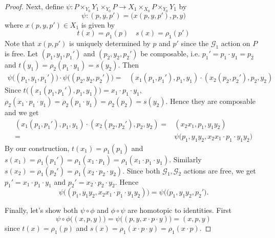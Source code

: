 \documentclass[12pt]{amsart}
\theoremstyle{definition}
\theoremstyle{remark}
\numberwithin{equation}{section}
\newcommand{\CG}{{\mathcal G}}
\begin{document}
\begin{proof}
	Next, define $\psi: P \times_{Y_0} Y_1\times_{Y_0}P\to X_1\times_{X_0} P\times_{Y_0} Y_1$ by
	\begin{equation}
	\psi: (p,y,p')=\big(x(p,y,p'),p,y\big)
	\end{equation}  
	where $x(p,y,p')\in X_1$ is given by 
	\begin{equation*}
	t(x)=\rho_1(p) \quad s(x)=\rho_1(p')
	\end{equation*}
	Note that $x(p,p')$ is uniquely determined by $p$ and $p'$ since the $\CG_1$ action on $P$ is free. Let $(p_1,y_1,p_1')$ and $(p_2,y_2,p_2')$ be composable, i.e. $p_1'=p_1\cdot y_1=p_2$ and $t(y_1)=\rho_2(p_1\cdot y_1)=s(y_2)$. Then
	\begin{align*}
	\psi\big((p_1,y_1,p_1')\big)\cdot \psi \big( (p_2,y_2,p_2')\big)=& (x_1(p_1,p_1'), p_1, y_1)\cdot (x_2(p_2,p_2'), p_2,y_2)
	\end{align*}  
	Since $t\big( (x_1(p_1,p_1'), p_1, y_1)\big)=x_1\cdot p_1\cdot y_1$, $\rho_2(x_1\cdot p_1\cdot y_1)=\rho_2(p_1\cdot y_1)=\rho_2(p_2)=s(y_2)$. Hence they are composable and we get 
	\begin{align*}
	(x_1(p_1,p_1'), p_1, y_1)\cdot (x_2(p_2,p_2'), p_2,y_2)=& (x_2x_1,p_1,y_1y_2)\\
	=&\psi\big(p_1, y_1y_2, x_2x_1\cdot p_1\cdot y_1y_2 \big)
	\end{align*}
By our construction, $	t(x_1)=\rho_1(p_1)$ and $s(x_1)=\rho_1(p_1')=\rho_1(x_1\cdot p_1)=\rho_1(x_1\cdot p_1\cdot y_1)$. Similarly $s(x_2)= \rho_1(p_2')=\rho_1(x_2\cdot p_2\cdot y_2)$. Since both $\CG_1, \CG_2$ actions are free, we get $p_1'=x_1\cdot p_1\cdot y_1$ and $p_2'=x_2\cdot p_2\cdot y_2$. Hence
\begin{equation*}
\psi\big((p_1, y_1y_2, x_2x_1\cdot p_1\cdot y_1y_2 )\big)=\psi\big((p_1, y_1y_2,p_2' \big).
\end{equation*}

Finally, let's show both $\psi\circ \phi$ and $\phi\circ \psi$ are homotopic to identities. First	 
	\begin{equation}
	\psi\circ \phi \big((x,p,y)\big)=\psi \big((p, y, x\cdot p\cdot y)\big)=(x,p,y)
	\end{equation}
	since $t(x)=\rho_1(p)$ and $s(x)=\rho_1(x\cdot p\cdot y)=\rho_1(x\cdot p)$.
	

\end{proof}
\end{document}
